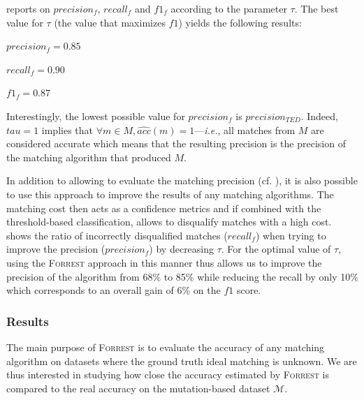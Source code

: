 \documentclass{vldb}
\newcommand{\forrest}[0]{\textsc{Forrest}\xspace}
\begin{document}
 reports on $precision_f$, $recall_f$ and $f1_f$ according to the parameter $\tau$.
The best value for $\tau$ (the value that maximizes $f1$) yields the following results:
\begin{compactitem}
    \item $precision_f = 0.85$ 
    \item $recall_f = 0.90$ 
    \item $f1_f = 0.87$ 
\end{compactitem}
Interestingly, the lowest possible value for $precision_f$ is $precision_{TED}$.
Indeed, $tau = 1$ implies that $\forall m \in M, \hat{acc}(m) = 1$---\emph{i.e.}, all matches from $M$ are considered accurate which means that the resulting precision is the precision of the matching algorithm that produced $M$.

In addition to allowing to evaluate the matching precision (cf. ), it is also possible to use this approach to improve the results of any matching algorithms.
The matching cost then acts as a confidence metrics and if combined with the threshold-based classification, allows to disqualify matches with a high cost.
 shows the ratio of incorrectly disqualified matches ($recall_f$) when trying to improve the precision ($precision_f$) by decreasing $\tau$.
For the optimal value of $\tau$, using the \forrest approach in this manner thus allows us to improve the precision of the algorithm from 68\% to 85\% while reducing the recall by only 10\% which corresponds to an overall gain of 6\% on the $f1$ score.

\subsubsection{Results}\label{sec:results}
The main purpose of \forrest is to evaluate the accuracy of any matching algorithm on datasets where the ground truth ideal matching is unknown.
We are thus interested in studying how close the accuracy estimated by \forrest is compared to the real accuracy on the mutation-based dataset $\mathscr{M}$.
\end{document}
